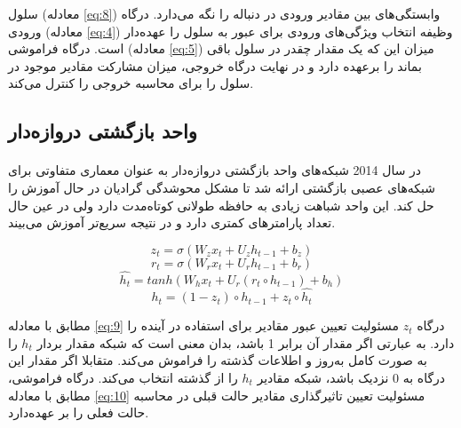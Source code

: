 {    سلول 
    (معادله \ref{eq:8})
    وابستگی‌های بین مقادیر ورودی در دنباله را نگه می‌دارد. درگاه ورودی
    (معادله \ref{eq:4})
    وظیفه انتخاب ویژگی‌های ورودی برای عبور به سلول را عهده‌دار است. 
    درگاه فراموشی 
    (معادله \ref{eq:5})
    میزان این که یک مقدار چقدر در سلول باقی بماند را برعهده دارد و در نهایت 
    درگاه خروجی، میزان مشارکت مقادیر موجود در سلول را برای محاسبه خروجی را 
    کنترل می‌کند. 
}

\subsection{
    واحد بازگشتی دروازه‌دار    
}
\label{subsec:rep_learn}
\paragraph{}
{
   در سال 2014 شبکه‌های واحد بازگشتی دروازه‌دار به عنوان معماری متفاوتی برای
   شبکه‌های عصبی بازگشتی ارائه شد تا مشکل محوشدگی گرادیان‌ در حال آموزش را حل کند.
   این واحد شباهت زیادی به حافظه طولانی کوتاه‌مدت دارد ولی در عین‌ حال تعداد
   پارامترهای کمتری دارد و در نتیجه سریع‌تر آموزش می‌بیند. 

   \begin{center}
        \begin{equation} \label{eq:9}
            z_t = \sigma (W_z x_t + U_z h_{t - 1} + b_z)
        \end{equation}
        \begin{equation} \label{eq:10}
            r_t = \sigma (W_r x_t + U_r h_{t - 1} + b_r)
        \end{equation}
        \begin{equation} \label{eq:11}
            \hat{h_t} = tanh (W_h x_t + U_r (r_t \circ h_{t - 1}) + b_h)
        \end{equation}
        \begin{equation} \label{eq:12}
            h_t = (1 - z_t) \circ h_{t - 1} + z_t \circ \hat{h_t}
        \end{equation}
    \end{center}
    
    مطابق با معادله 
    \ref{eq:9}
    درگاه $z_t$
    مسئولیت تعیین عبور مقادیر برای استفاده در آینده را دارد. به عبارتی اگر 
    مقدار آن برابر 1 باشد، بدان معنی است که شبکه مقدار بردار 
    $h_t$ 
    را به صورت کامل به‌روز و اطلاعات گذشته را فراموش می‌کند. متقابلا اگر 
    مقدار این درگاه به 0 نزدیک باشد، شبکه مقادیر $h_t$ 
    را از گذشته انتخاب می‌کند. درگاه فراموشی، مطابق با معادله
    \ref{eq:10}
    مسئولیت تعیین تاثیرگذاری مقادیر حالت قبلی در محاسبه حالت فعلی را بر عهده‌دارد.

}
